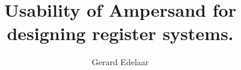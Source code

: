 \documentclass{ou-report-af}
\begin{document}
\pagestyle{plain}
\title{Usability of Ampersand for designing register systems.} 
\begin{comment}
Bruikbaarheid van Ampersand voor het ontwerpen van registersystemen.
\end{comment}
\author{Gerard Edelaar}


\newpage


\newpage


\let\cleardoublepage\clearpage












%

\newpage
\newpage
\printglossary






\end{document}
